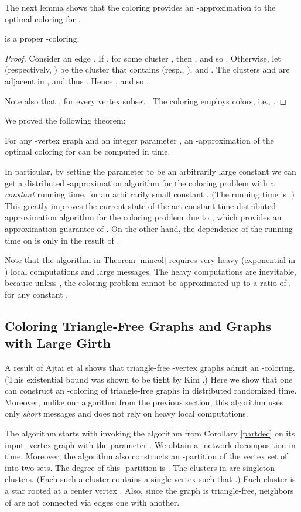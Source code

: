 \documentclass[11pt]{article}
\begin{document}
The next lemma shows that the coloring  provides an -approximation to the optimal coloring for . \begin{lem} \label{appcol}
 is a proper -coloring.
\end{lem}
\begin{proof}
Consider an edge . If , for some cluster , then , and so . Otherwise, let  (respectively, ) be the cluster that contains  (resp., ), and . The clusters  and  are adjacent in , and thus . Hence , and so . 

Note also that , for every vertex subset . The coloring  employs  colors, i.e., .
\end{proof}We proved the following theorem:
\begin{thm} \label{mincol}
For any -vertex graph  and an integer parameter , an -approximation of the optimal coloring for  can be computed in  time.
\end{thm}
In particular, by setting the parameter  to be an arbitrarily large constant we can get a distributed -approximation algorithm for the coloring problem with a {\em constant} running time, for an arbitrarily small constant . (The running time is .)
This greatly improves the current state-of-the-art constant-time distributed approximation algorithm for the coloring problem due to \cite{B12}, which provides an approximation guarantee of . On the other hand, the dependence of the running time on  is only  in the result of \cite{B12}.


Note that the algorithm in Theorem \ref{mincol} requires very heavy (exponential in ) local computations and large messages. The heavy computations are inevitable, because unless , the coloring problem cannot be approximated up to a ratio of , for any constant  \cite{H96,FK98,Z07}.
\subsection{Coloring Triangle-Free Graphs and Graphs with Large Girth}
A result of Ajtai et al \cite{AKS80} shows that triangle-free -vertex graphs  admit an -coloring. (This existential bound was shown to be tight by Kim \cite{K95}.) Here we show that one can construct an -coloring of triangle-free graphs in distributed randomized  time. Moreover, unlike our algorithm from the previous section, this algorithm uses only {\em short} messages and does not rely on heavy local computations.

The algorithm starts with invoking the algorithm from Corollary \ref{partdec} on its input -vertex graph  with the parameter . We obtain a -network decomposition  in  time. Moreover, the algorithm also constructs an -partition  of the vertex set  of  into two sets. The degree of this -partition is . The clusters in  are singleton clusters. (Each such a cluster  contains a single vertex  such that .) Each cluster  is a star rooted at a center vertex . Also, since the graph is triangle-free, neighbors of  are not connected via edges one with another.
\end{document}
